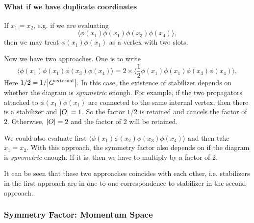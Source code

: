 \documentclass{article}
\begin{document}
\paragraph{What if we have duplicate coordinates}
If $x_1 = x_2$, e.g. if we are evaluating
\[ \langle \phi(x_1) \phi(x_1) \phi(x_3) \phi(x_4) \rangle, \]
then we may treat $\phi(x_1) \phi(x_1)$ as a vertex with two slots.
\par
Now we have two approaches.
One is to write
\[ \langle \phi(x_1) \phi(x_1) \phi(x_3) \phi(x_4) \rangle = 2 \times \langle \frac{1}{2}\phi(x_1) \phi(x_1) \phi(x_3) \phi(x_4) \rangle, \]
Here $1/2 = 1/\abs{G^{\text{external}}}$.
In this case, the existence of stabilizer depends on whether the diagram is \textit{symmetric} enough.
For example, if the two propagators attached to $\phi(x_1)\phi(x_1)$ are connected to the same internal vertex, then there is a stabilizer and $\abs{O} = 1$.
So the factor $1/2$ is retained and cancels the factor of $2$.
Otherwise, $\abs{O} = 2$ and the factor of $2$ will be retained.
\par
We could also evaluate first $\langle \phi(x_1) \phi(x_2) \phi(x_3) \phi(x_4) \rangle$ and then take $x_1 = x_2$.
With this approach, the symmetry factor also depends on if the diagram is \textit{symmetric} enough.
If it is, then we have to multiply by a factor of $2$.
\par
It can be seen that these two approaches coincides with each other, i.e. stabilizers in the first approach are in one-to-one correspondence to stabilizer in the second approach.

\subsubsection{Symmetry Factor: Momentum Space}
\end{document}
